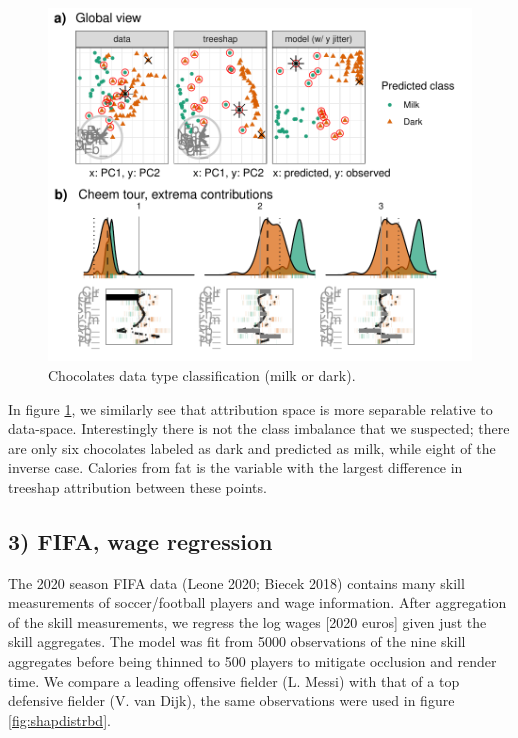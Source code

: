 \documentclass[
  article]{article}
\begin{document}
\begin{figure}

{\centering \includegraphics[width=1\linewidth]{./figures/case_chocolates} 

}

\caption{Chocolates data type classification (milk or dark).}\label{fig:casechocolates}
\end{figure}

In figure \ref{fig:casechocolates}, we similarly see that attribution space is more separable relative to data-space. Interestingly there is not the class imbalance that we suspected; there are only six chocolates labeled as dark and predicted as milk, while eight of the inverse case. Calories from fat is the variable with the largest difference in treeshap attribution between these points.

\hypertarget{fifa-wage-regression}{%
\subsection{3) FIFA, wage regression}\label{fifa-wage-regression}}

The 2020 season FIFA data (Leone 2020; Biecek 2018) contains many skill measurements of soccer/football players and wage information. After aggregation of the skill measurements, we regress the log wages {[}2020 euros{]} given just the skill aggregates. The model was fit from 5000 observations of the nine skill aggregates before being thinned to 500 players to mitigate occlusion and render time. We compare a leading offensive fielder (L. Messi) with that of a top defensive fielder (V. van Dijk), the same observations were used in figure \ref{fig:shapdistrbd}.
\end{document}
